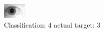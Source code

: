 \begin{figure}[h!]
\begin{center}
\includegraphics[width=0.60\columnwidth]{figures/ID1890_class_4_target_3.png}
\end{center}
\caption{ Classification: 4 actual target: 3}
\label{fig:ID1890_class_4_target_3}
\end{figure}
